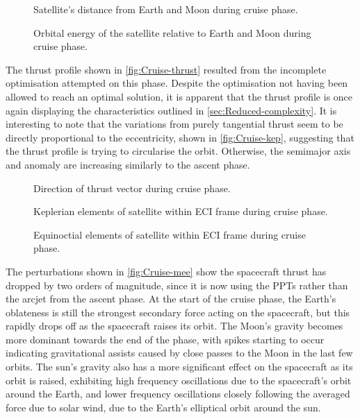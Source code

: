\begin{figure}
\centering
\def\svgwidth{\figurewidth}

\caption{Satellite's distance from Earth and Moon during cruise phase.}
\label{fig:Cruise-dist}
\end{figure}

\begin{figure}
\centering
\def\svgwidth{\figurewidth}

\caption{Orbital energy of the satellite relative to Earth and Moon during cruise phase.}
\label{fig:Cruise-orbeng}
\end{figure}

The thrust profile shown in \autoref{fig:Cruise-thrust} resulted from the incomplete optimisation attempted on this phase. Despite the optimisation not having been allowed to reach an optimal solution, it is apparent that the thrust profile is once again displaying the characteristics outlined in \autoref{sec:Reduced-complexity}. It is interesting to note that the variations from purely tangential thrust seem to be directly proportional to the eccentricity, shown in \autoref{fig:Cruise-kep}, suggesting that the thrust profile is trying to circularise the orbit. Otherwise, the semimajor axis and anomaly are increasing similarly to the ascent phase.

\begin{figure}
\centering
\def\svgwidth{\figurewidth}

\caption{Direction of thrust vector during cruise phase.}
\label{fig:Cruise-thrust}
\end{figure}

\begin{figure}
\centering
\def\svgwidth{\figurewidth}

\caption{Keplerian elements of satellite within ECI frame during cruise phase.}
\label{fig:Cruise-kep}
\end{figure}

\begin{figure}
\centering
\def\svgwidth{\figurewidth}

\caption{Equinoctial elements of satellite within ECI frame during cruise phase.}
\label{fig:Cruise-mee}
\end{figure}

The perturbations shown in \autoref{fig:Cruise-mee} show the spacecraft thrust has dropped by two orders of magnitude, since it is now using the PPTs rather than the arcjet from the ascent phase. At the start of the cruise phase, the Earth's oblateness is still the strongest secondary force acting on the spacecraft, but this rapidly drops off as the spacecraft raises its orbit. The Moon's gravity becomes more dominant towards the end of the phase, with spikes starting to occur indicating gravitational assists caused by close passes to the Moon in the last few orbits. The sun's gravity also has a more significant effect on the spacecraft as its orbit is raised, exhibiting high frequency oscillations due to the spacecraft's orbit around the Earth, and lower frequency oscillations closely following the averaged force due to solar wind, due to the Earth's elliptical orbit around the sun.

